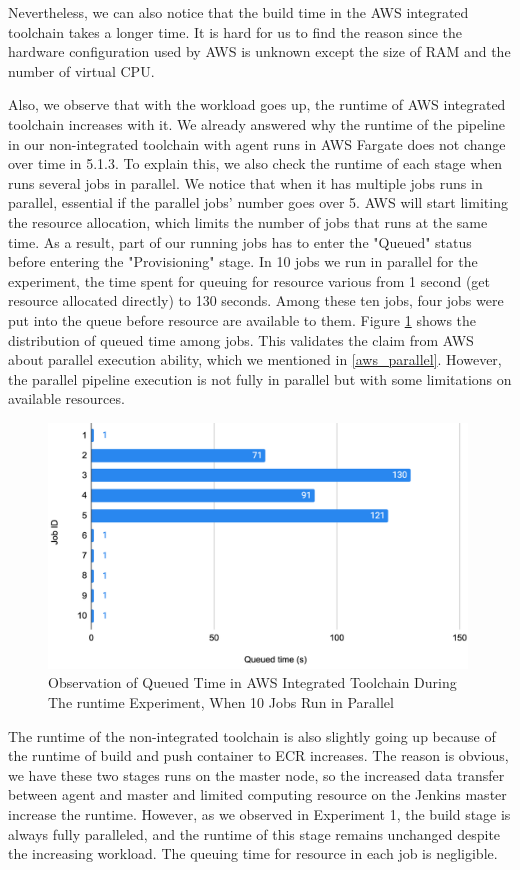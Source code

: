  Nevertheless, we can also notice that the build time in the AWS integrated toolchain takes a longer time. It is hard for us to find the reason since the hardware configuration used by AWS is unknown except the size of RAM and the number of virtual CPU.
\par
 Also, we observe that with the workload goes up, the runtime of AWS integrated toolchain increases with it. We already answered why the runtime of the pipeline in our non-integrated toolchain with agent runs in AWS Fargate does not change over time in 5.1.3. To explain this, we also check the runtime of each stage when runs several jobs in parallel. We notice that when it has multiple jobs runs in parallel, essential if the parallel jobs' number goes over 5. AWS will start limiting the resource allocation, which limits the number of jobs that runs at the same time. As a result, part of our running jobs has to enter the "Queued" status before entering the "Provisioning" stage. In 10 jobs we run in parallel for the experiment, the time spent for queuing for resource various from 1 second (get resource allocated directly) to 130 seconds. Among these ten jobs, four jobs were put into the queue before resource are available to them. Figure \ref{fig:queued} shows the distribution of queued time among jobs. This validates the claim from AWS about parallel execution ability, which we mentioned in \ref{aws_parallel}. However, the parallel pipeline execution is not fully in parallel but with some limitations on available resources.
 \begin{figure}[!h]
  \centering
  \includegraphics[width=0.99\textwidth]{pics/queued_time.png}
  \caption{Observation of Queued Time in AWS Integrated Toolchain During The runtime Experiment, When 10 Jobs Run in Parallel}
  \label{fig:queued}
  \end{figure}
 \par
 The runtime of the non-integrated toolchain is also slightly going up because of the runtime of build and push container to ECR increases. The reason is obvious, we have these two stages runs on the master node, so the increased data transfer between agent and master and limited computing resource on the Jenkins master increase the runtime. However, as we observed in Experiment 1, the build stage is always fully paralleled, and the runtime of this stage remains unchanged despite the increasing workload. The queuing time for resource in each job is negligible.
